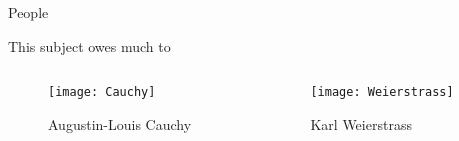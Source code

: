 \documentclass{beamer}		%
\begin{document}
\begin{frame}{People}

This subject owes much to 

\begin{columns}	%

\begin{column}{0.4\textwidth} %
\begin{figure}	%
\texttt{[image: Cauchy]}	%
\caption{Augustin-Louis Cauchy}	%
\end{figure}
\end{column}

\begin{column}{0.4\textwidth}
\begin{figure}
\texttt{[image: Weierstrass]}
\caption{Karl Weierstrass}
\end{figure}
\end{column}

\end{columns}

\end{frame}
\end{document}
